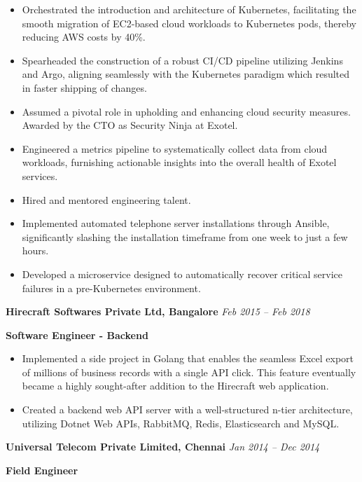 \documentclass[11pt, oneside]{article}
\begin{document}
\begin{itemize} 
  \item Orchestrated the introduction and architecture of Kubernetes, facilitating the smooth migration of EC2-based cloud workloads to Kubernetes pods, thereby reducing AWS costs by 40\%.
  \item Spearheaded the construction of a robust CI/CD pipeline utilizing Jenkins and Argo, aligning seamlessly with the Kubernetes paradigm which resulted in faster shipping of changes.
  \item Assumed a pivotal role in upholding and enhancing cloud security measures. Awarded by the CTO as Security Ninja at Exotel.
  \item Engineered a metrics pipeline to systematically collect data from cloud workloads, furnishing actionable insights into the overall health of Exotel services.
  \item Hired and mentored engineering talent.
  \item Implemented automated telephone server installations through Ansible, significantly slashing the installation timeframe from one week to just a few hours.
  \item Developed a microservice designed to automatically recover critical service failures in a pre-Kubernetes environment.

\end{itemize}

\medskip

\textbf{Hirecraft Softwares Private Ltd, Bangalore}
\hfill
\textit{Feb 2015 – Feb 2018}
								 
\textbf{Software Engineer - Backend}

\begin{itemize}
  \item Implemented a side project in Golang that enables the seamless Excel export of millions of business records with a single API click. This feature eventually became a highly sought-after addition to the Hirecraft web application.
  \item Created a backend web API server with a well-structured n-tier architecture, utilizing Dotnet Web APIs, RabbitMQ, Redis, Elasticsearch and MySQL.

\end{itemize}

\medskip

\textbf{Universal Telecom Private Limited, Chennai}
\hfill
\textit{Jan 2014 – Dec 2014}
								 
\textbf{Field Engineer}
\end{document}
